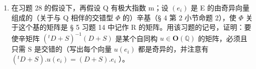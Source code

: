 \begin{enumerate}
\def\labelenumi{\arabic{enumi})}
\setcounter{enumi}{28}
\tightlist
\item
  在习题 28 的假设下，再假设 Q 有极大指数 m；设 \((e_{i})\) 是 E 的由奇异向量组成的（关于与 Q 相伴的交错型 \(\Phi\) 的）辛基（§ 4 第 2 小节命题 2），使 \(\Phi\) 关于这个基的矩阵是 § 5 习题 14 中记作 R 的矩阵。用该习题的记号，证明：要使辛矩阵 \((^{t}D + S)^{-1}(D + S)\) 是某个自同构 \(u \in \mathbf{O}(\mathbb{Q})\) 的矩阵，必须且只需 S 是交错的（写出每个向量 \(u(e_{i})\) 都是奇异的，并注意有 \((^{t}D + S).u(e_{i}) = (D + S).e_{i}\) ）。
\end{enumerate}

